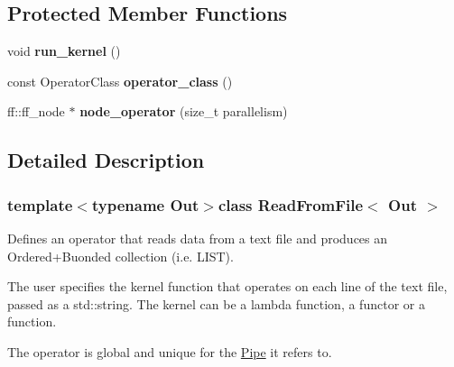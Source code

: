 \subsection*{\-Protected \-Member \-Functions}
\begin{DoxyCompactItemize}
\item 
\hypertarget{class_read_from_file_af1d716032c6d0b662aba9318584b14ff}{void {\bfseries run\-\_\-kernel} ()}\label{class_read_from_file_af1d716032c6d0b662aba9318584b14ff}

\item 
\hypertarget{class_read_from_file_a1cb0beec0a2db61f86dea66931373726}{const \-Operator\-Class {\bfseries operator\-\_\-class} ()}\label{class_read_from_file_a1cb0beec0a2db61f86dea66931373726}

\item 
\hypertarget{class_read_from_file_a09f10e5b2ab8a1e303dc0e700fe726f0}{ff\-::ff\-\_\-node $\ast$ {\bfseries node\-\_\-operator} (size\-\_\-t parallelism)}\label{class_read_from_file_a09f10e5b2ab8a1e303dc0e700fe726f0}

\end{DoxyCompactItemize}


\subsection{\-Detailed \-Description}
\subsubsection*{template$<$typename Out$>$class Read\-From\-File$<$ Out $>$}

\-Defines an operator that reads data from a text file and produces an \-Ordered+\-Buonded collection (i.\-e. \-L\-I\-S\-T).

\-The user specifies the kernel function that operates on each line of the text file, passed as a std\-::string. \-The kernel can be a lambda function, a functor or a function.

\-The operator is global and unique for the \hyperlink{class_pipe}{\-Pipe} it refers to. 

